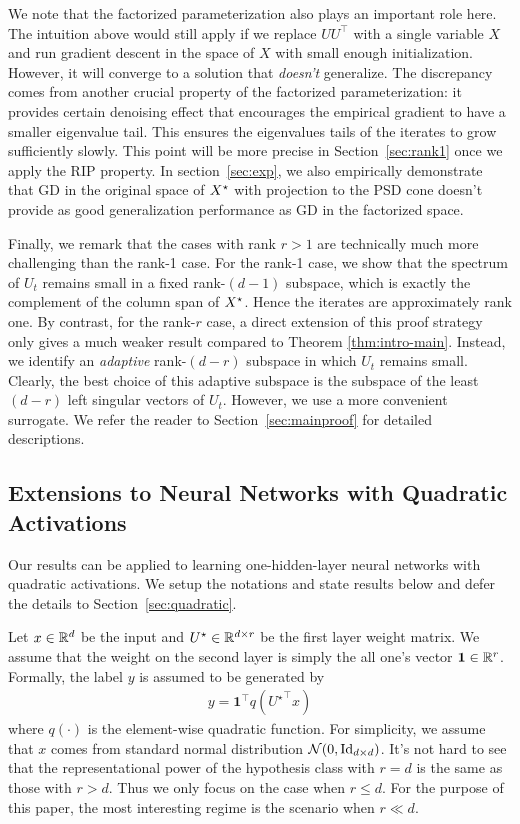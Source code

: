 We note that the factorized parameterization also plays an important role here. The intuition above would still apply if we replace $UU^\top$ with a single variable $X$ and run gradient descent in the space of $X$ with small enough initialization. However, it will converge to a solution that \textit{doesn't} generalize.  The discrepancy comes from another crucial property of the factorized parameterization: it provides certain denoising effect that encourages the empirical gradient to have a smaller eigenvalue tail. This ensures the eigenvalues tails of the iterates to grow sufficiently slowly. This point will be more precise in Section~\ref{sec:rank1} once we apply the RIP property. In section~\ref{sec:exp}, we also empirically demonstrate that GD in the original space of ${X}^\star$ with projection to the PSD cone doesn't provide as good generalization performance as GD in the factorized space.  

Finally, we remark that the cases with rank $r> 1$ are technically much more challenging than the rank-1 case. For the rank-1 case, we show that the spectrum of $U_t$ remains small in a fixed rank-$(d-1)$ subspace, which is exactly the complement of the column span of ${X}^\star$. Hence the iterates are approximately rank one. By contrast, for the rank-$r$ case, a direct extension of this proof strategy only gives a much weaker result compared to Theorem \ref{thm:intro-main}. Instead, we identify an \textit{adaptive}  rank-$(d-r)$ subspace in which $U_t$ remains small. Clearly, the best choice of this adaptive subspace is the subspace of the least $(d-r)$ left singular vectors of $U_t$. However, we use a more convenient surrogate. We refer the reader to Section~\ref{sec:mainproof} for detailed descriptions.



\subsection{Extensions to Neural Networks with Quadratic Activations}

Our results can be applied to learning one-hidden-layer neural networks with quadratic activations. We setup the notations and state results below and defer the details to Section~\ref{sec:quadratic}. 

Let $x\in \mathbb{R}^d$ be the input and $U^\star\in \mathbb{R}^{d\times r}$ be the first layer weight matrix. We assume that the weight on the second layer is simply the all one's vector $\mathbf{1}\in \mathbb{R}^r$.  Formally, the label $y$ is assumed to be generated by 
\begin{align}
y = \mathbf{1}^\top q({U^\star}^\top x)  \label{eqn:qnn}
\end{align}
where $q(\cdot)$ is the element-wise quadratic function. For simplicity, we assume that $x$ comes from standard normal distribution $\mathcal{N}(0,\operatorname{Id}_{d\times d})$. It's not hard to see that the representational power of the hypothesis class with $r=d$ is the same as those with $r > d$. Thus we only focus on the case when $r \le d$.
For the purpose of this paper, the most interesting regime is the scenario when $r\ll d$. 

